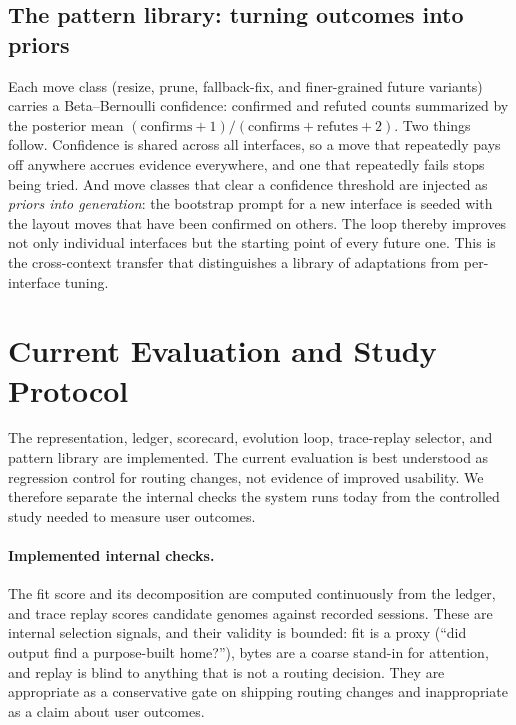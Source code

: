 \documentclass[11pt]{article}
\begin{document}
\subsection{The pattern library: turning outcomes into priors}
\label{sec:patterns}

Each move class (resize, prune, fallback-fix, and finer-grained future variants)
carries a Beta--Bernoulli confidence: confirmed and refuted counts summarized by
the posterior mean $(\text{confirms}+1)/(\text{confirms}+\text{refutes}+2)$. Two
things follow. Confidence is shared across all interfaces, so a move that
repeatedly pays off anywhere accrues evidence everywhere, and one that repeatedly
fails stops being tried. And move classes that clear a confidence threshold are
injected as \emph{priors into generation}: the bootstrap prompt for a new
interface is seeded with the layout moves that have been confirmed on others. The
loop thereby improves not only individual interfaces but the starting point of
every future one. This is the cross-context transfer that distinguishes a library
of adaptations from per-interface tuning.

\section{Current Evaluation and Study Protocol}
\label{sec:eval}

The representation, ledger, scorecard, evolution loop, trace-replay selector, and
pattern library are implemented. The current evaluation is best understood as
regression control for routing changes, not evidence of improved usability. We
therefore separate the internal checks the system runs today from the controlled
study needed to measure user outcomes.

\paragraph{Implemented internal checks.}
The fit score and its decomposition are computed continuously from the ledger,
and trace replay scores candidate genomes against recorded sessions. These are
internal selection signals, and their validity is bounded: fit is a proxy
(``did output find a purpose-built home?''), bytes are a coarse stand-in for
attention, and replay is blind to anything that is not a routing decision. They
are appropriate as a conservative gate on shipping routing changes and
inappropriate as a claim about user outcomes.
\end{document}
